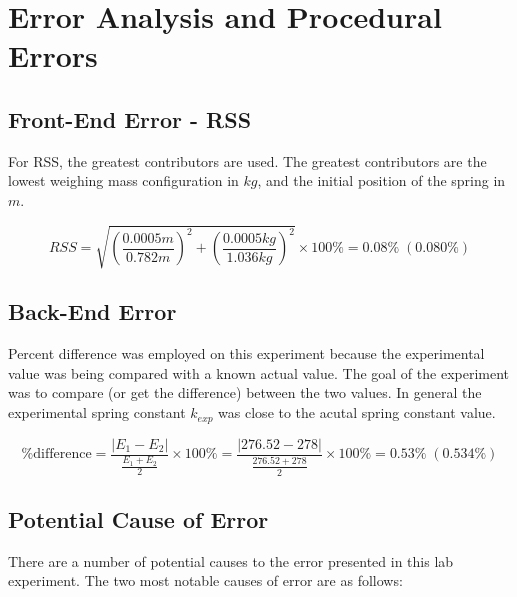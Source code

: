 \chapter{Error Analysis and Procedural Errors}

\section{Front-End Error - RSS}

For RSS, the greatest contributors are used. The greatest contributors are 
the lowest weighing mass configuration in $kg$, and the initial position of 
the spring in $m$.
  
  \begin{equation*}
    RSS = \sqrt{\left( \frac{0.0005m}{0.782m} \right)^2 
    + \left( \frac{0.0005kg}{1.036kg} \right)^2} \times 100\% = 0.08\% \; (0.080\%)
  \end{equation*}

\section{Back-End Error}

Percent difference was employed on this experiment because the experimental value was 
being compared with a known actual value. The goal of the experiment was to compare (or
get the difference) between the two values. In general the experimental spring constant $k_{exp}$
was close to the acutal spring constant value.

\begin{equation*}
  \%\text{difference}= \frac{|E_1 - E_2|}{\frac{E_1 + E_2}{2}} \times 100\% = 
  \frac{|276.52 - 278|}{\frac{276.52 + 278}{2}} \times 100\% = 0.53\% \; (0.534\%)
\end{equation*}

\section{Potential Cause of Error}

\noindent There are a number of potential causes to the error presented in this lab
experiment. The two most notable causes of error are as follows:

